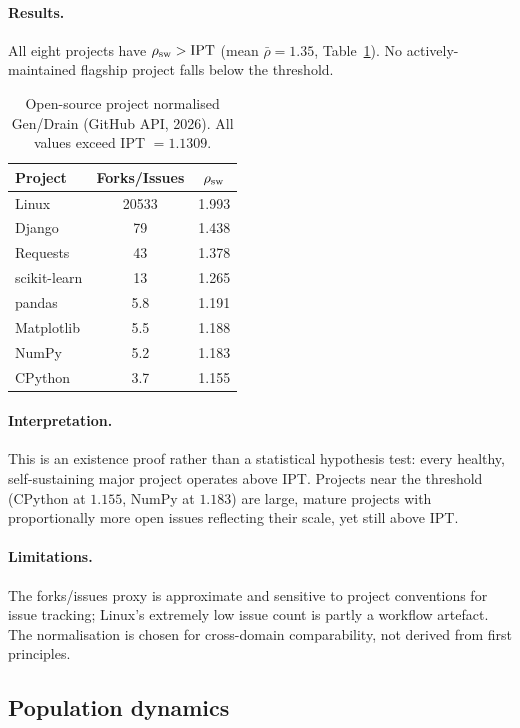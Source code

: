 \documentclass[11pt,twocolumn]{article}
\theoremstyle{remark}
\begin{document}
\paragraph{Results.}
All eight projects have $\rho_{\rm sw} > \mathrm{IPT}$ (mean $\bar\rho = 1.35$,
Table~\ref{tab:software}). No actively-maintained flagship project falls below the threshold.

\begin{table}[ht]
\centering
\caption{Open-source project normalised Gen/Drain (GitHub API, 2026).
All values exceed IPT $= 1.1309$.}
\label{tab:software}
\begin{tabular}{@{}lcc@{}}
\toprule
Project & Forks/Issues & $\rho_{\rm sw}$ \\
\midrule
Linux       & 20533 & 1.993 \\
Django      &    79 & 1.438 \\
Requests    &    43 & 1.378 \\
scikit-learn&    13 & 1.265 \\
pandas      &   5.8 & 1.191 \\
Matplotlib  &   5.5 & 1.188 \\
NumPy       &   5.2 & 1.183 \\
CPython     &   3.7 & 1.155 \\
\bottomrule
\end{tabular}
\end{table}

\paragraph{Interpretation.}
This is an existence proof rather than a statistical hypothesis test: every healthy,
self-sustaining major project operates above IPT. Projects near the threshold
(CPython at $1.155$, NumPy at $1.183$) are large, mature projects with proportionally
more open issues reflecting their scale, yet still above IPT.

\paragraph{Limitations.}
The forks/issues proxy is approximate and sensitive to project conventions for issue
tracking; Linux's extremely low issue count is partly a workflow artefact. The normalisation
is chosen for cross-domain comparability, not derived from first principles.

\subsection{Population dynamics}
\label{sec:realworld:pop}
\end{document}

